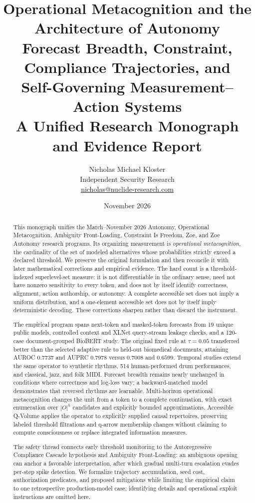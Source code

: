 \documentclass[11pt,letterpaper]{article}
\title{\textbf{Operational Metacognition and the Architecture of Autonomy}\\[7pt]
\Large Forecast Breadth, Constraint, Compliance Trajectories, and\\Self-Governing Measurement--Action Systems\\[7pt]
\large A Unified Research Monograph and Evidence Report}
\author{Nicholas Michael Kloster\\
Independent Security Research\\
\href{mailto:nicholas@nuclide-research.com}{nicholas@nuclide-research.com}}
\date{November 2026}
\theoremstyle{definition}
\theoremstyle{plain}
\theoremstyle{remark}
\begin{document}
\maketitle
\thispagestyle{fancy}

\begin{abstract}
\noindent
This monograph unifies the March--November 2026 Autonomy, Operational Metacognition, Ambiguity Front-Loading, Constraint Is Freedom, Zoe, and Zoe Autonomy research programs. Its organizing measurement is \emph{operational metacognition}, the cardinality of the set of modeled alternatives whose probabilities strictly exceed a declared threshold. We preserve the original formulation and then reconcile it with later mathematical corrections and empirical evidence. The hard count is a threshold-indexed superlevel-set measure: it is not differentiable in the ordinary sense, need not have nonzero sensitivity to every token, and does not by itself identify correctness, alignment, action authorship, or autonomy. A complete accessible set does not imply a uniform distribution, and a one-element accessible set does not by itself imply deterministic decoding. These corrections sharpen rather than discard the instrument.

The empirical program spans next-token and masked-token forecasts from 19 unique public models, controlled context and XLNet query-stream leakage checks, and a 120-case document-grouped BioBERT study. The original fixed rule at $\tau=0.05$ transferred better than the selected adaptive rule to held-out biomedical documents, attaining AUROC $0.7737$ and AUPRC $0.7978$ versus $0.7008$ and $0.6599$. Temporal studies extend the same operator to synthetic rhythms, 514 human-performed drum performances, and classical, jazz, and folk MIDI. Forecast breadth remains nearly unchanged in conditions where correctness and log-loss vary; a backward-matched model demonstrates that reversed rhythms are learnable. Multi-horizon operational metacognition changes the unit from a token to a complete continuation, with exact enumeration over $|O|^h$ candidates and explicitly bounded approximations. Accessible Q-Volume applies the operator to explicitly supplied causal repertoires, preserving labeled threshold filtrations and q-arrow membership changes without claiming to compute consciousness or replace integrated information measures.

The safety thread connects early threshold monitoring to the Autoregressive Compliance Cascade hypothesis and Ambiguity Front-Loading: an ambiguous opening can anchor a favorable interpretation, after which gradual multi-turn escalation evades per-step spike detection. We formalize trajectory accumulation, seed cost, authorization predicates, and proposed mitigations while limiting the empirical claim to one retrospective production-model case; identifying details and operational exploit instructions are omitted here.


\end{abstract}
\end{document}
